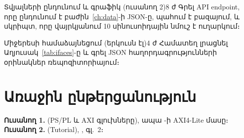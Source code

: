 \begin{warmup}{Տվյալների ընդունում և գրաֆիկ (ուսանող 2)}{8 ժ}
  Գրել API endpoint, որը ընդունում է բաժին~\ref{ch:data}-ի JSON-ը, պահում է բազայում, և սկրիպտ, որը վայրկյանում 10 սինուսոիդային նմուշ է ուղարկում։
\end{warmup}

\begin{warmup}{Միջերեսի համաձայնեցում (երկուսն էլ)}{4 ժ}
  Համատեղ լրացնել Աղյուսակ~\ref{tab:ifaces}-ը և գրել JSON հաղորդագրությունների օրինակներ ռեպոզիտորիայում։
\end{warmup}

\section{Առաջին ընթերցանություն}
\textbf{Ուսանող 1.} \cite{zynqbook} (PS/PL և AXI գլուխները), ապա \cite{axispec}-ի AXI4-Lite մասը։
\textbf{Ուսանող 2.} \cite{fastapi} (Tutorial), \cite{kleppmann2017}, գլ.~2։
